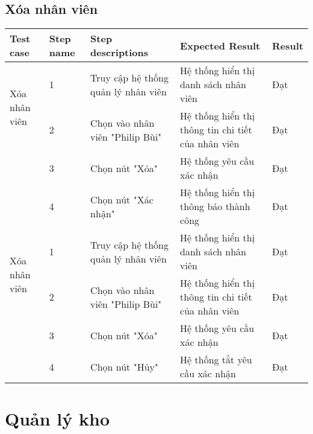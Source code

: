 \subsection{Xóa nhân viên}
{
    \setlength\extrarowheight{6pt}
    \begin{longtable}{| p{2.5cm}| p{1cm}| p{5.5cm}| p{4.5cm} | p{1.5cm} |}
        \hline
        \textbf{Test case} & \textbf{Step name} & \textbf{Step descriptions} & \textbf{Expected Result} & \textbf{Result} \\
        \hline
        \multirow[t]{2}{2.5cm}{Xóa nhân viên} & 1 & Truy cập hệ thống quản lý nhân viên & Hệ thống hiển thị danh sách nhân viên & Đạt \\
        \cline{2-5}
         & 2 & Chọn vào nhân viên "Philip Bùi" & Hệ thống hiển thị thông tin chi tiết của nhân viên & Đạt \\
        \cline{2-5}
        & 3 & Chọn nút "Xóa" & Hệ thống yêu cầu xác nhận & Đạt \\
        \cline{2-5}
         & 4 & Chọn nút "Xác nhận" & Hệ thống hiển thị thông báo thành công & Đạt \\
        \hline
        \multirow[t]{2}{2.5cm}{Xóa nhân viên} & 1 & Truy cập hệ thống quản lý nhân viên & Hệ thống hiển thị danh sách nhân viên & Đạt \\
        \cline{2-5}
         & 2 & Chọn vào nhân viên "Philip Bùi" & Hệ thống hiển thị thông tin chi tiết của nhân viên & Đạt \\
        \cline{2-5}
        & 3 & Chọn nút "Xóa" & Hệ thống yêu cầu xác nhận & Đạt \\
        \cline{2-5}
         & 4 & Chọn nút "Hủy" & Hệ thống tắt yêu cầu xác nhận & Đạt \\
        \hline
    \end{longtable} 
}

\section{Quản lý kho}
